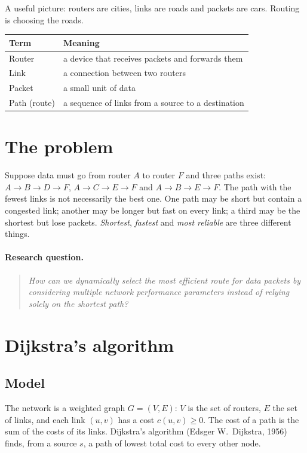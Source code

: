 \documentclass[11pt,a4paper]{article}
\begin{document}
A useful picture: routers are cities, links are roads and packets are cars. Routing is choosing the
roads.

\begin{center}
\begin{tabular}{ll}
\toprule
Term & Meaning \\
\midrule
Router & a device that receives packets and forwards them \\
Link & a connection between two routers \\
Packet & a small unit of data \\
Path (route) & a sequence of links from a source to a destination \\
\bottomrule
\end{tabular}
\end{center}

\section{The problem}
Suppose data must go from router $A$ to router $F$ and three paths exist:
$A\to B\to D\to F$, $A\to C\to E\to F$ and $A\to B\to E\to F$.
The path with the fewest links is not necessarily the best one. One path may be short but contain a
congested link; another may be longer but fast on every link; a third may be the shortest but lose
packets. \emph{Shortest}, \emph{fastest} and \emph{most reliable} are three different things.

\paragraph{Research question.}
\begin{quote}
\itshape How can we dynamically select the most efficient route for data packets by considering
multiple network performance parameters instead of relying solely on the shortest path?
\end{quote}

\section{Dijkstra's algorithm}
\subsection{Model}
The network is a weighted graph $G=(V,E)$: $V$ is the set of routers, $E$ the set of links, and each
link $(u,v)$ has a cost $c(u,v)\ge 0$. The cost of a path is the sum of the costs of its links.
Dijkstra's algorithm (Edsger W.~Dijkstra, 1956) finds, from a source $s$, a path of lowest total
cost to every other node.
\end{document}
